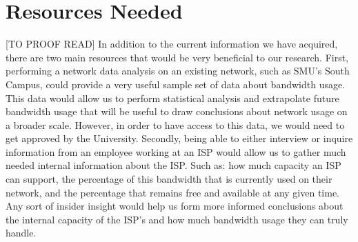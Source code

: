 \documentclass{sigcomm-alternate}
\begin{document}
\section{Resources Needed}
[TO PROOF READ]
In addition to the current information we have acquired, there are two main resources that would be very beneficial to our research. First, performing a network data analysis on an existing network, such as SMU's South Campus, could provide a very useful sample set of data about bandwidth usage. This data would allow us to perform statistical analysis and extrapolate future bandwidth usage that will be useful to draw conclusions about network usage on a broader scale. However, in order to have access to this data, we would need to get approved by the University. Secondly, being able to either interview or inquire information from an employee working at an ISP would allow us to gather much needed internal information about the ISP. Such as: how much capacity an ISP can support, the percentage of this bandwidth that is currently used on their network, and the percentage that remains free and available at any given time. Any sort of insider insight would help us form more informed conclusions about the internal capacity of the ISP's and how much bandwidth usage they can truly handle.




\end{document}
